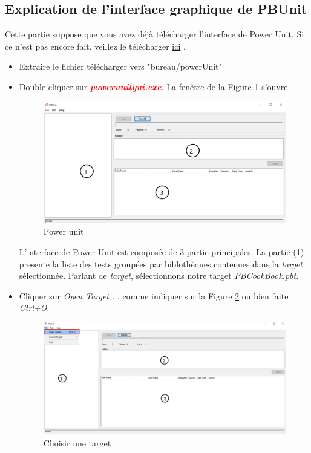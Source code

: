 \documentclass[a4paper,11pt,french]{report}
\theoremstyle{definition}
\begin{document}
\subsection{Explication de l'interface graphique de PBUnit}
Cette partie suppose que vous avez déjà télécharger l'interface de Power  Unit. Si ce n'est pas encore fait, veillez le télécharger \href{https://github.com/mahugnon/PowerUnitHonore/releases/download/v3.1.2/powerUnit.zip}{ici} .
\begin{itemize}
    \item  Extraire le  fichier télécharger  vers "bureau/powerUnit"
    \item  Double cliquer sur \textbf{\textit{\textcolor{red}{powerunitgui.exe}}}. 
    La fenêtre de la Figure \ref{fig:emptyPowerUnit} s'ouvre
    \begin{figure}[!htbp]
        \begin{center}
        \includegraphics[width=1\linewidth]{./emptyPowerUnit.png}
        \caption{Power unit}
        \label{fig:emptyPowerUnit}
        \end{center}
      \end{figure}
   L'interface de Power Unit est composée de 3 partie principales.
 La partie (1) presente la liste des tests groupées par biblothèques  contenues dans la \textit{target} sélectionnée.
Parlant de \textit{target}, sélectionnons notre target \textit{PBCookBook.pbt}.
\item  Cliquer sur \textit{Open Target ...} comme indiquer sur la Figure \ref{fig:openTarget} ou bien faite \textit{Ctrl+O}.

\begin{figure}[!htbp]
    \begin{center}
    \includegraphics[width=1\linewidth]{./openTarget.png}
    \caption{Choisir une target}
    \label{fig:openTarget}
    \end{center}
  \end{figure}


\end{itemize}
\end{document}
